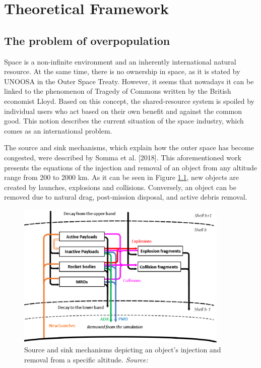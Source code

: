 \chapter{Theoretical Framework}
\label{chap:2}

\section{The problem of overpopulation}
\bigskip

Space is a non-infinite environment and an inherently %
international natural resource. At the same time, there is no ownership in space, as it is stated by UNOOSA in the Outer Space Treaty. However, it seems that nowadays it can be linked to the phenomenon of Tragedy of Commons written by the British economist Lloyd. Based on this concept, the shared-resource system is spoiled by individual users who act based on their own benefit and against the common good. This notion describes the current situation of the space industry, which comes as an international problem.

\bigskip
The source and sink mechanisms, which explain how the outer space has become congested, were described by Somma et al. [2018]. This aforementioned work \cite{Somma 2019} presents the equations of the injection and removal of an object from any altitude range from 200 to 2000 km. As it can be seen in Figure \ref{mechanism}, new objects are created by launches, explosions and collisions. Conversely, an object can be removed due to natural drag, post-mission disposal, and active debris removal.

\begin{figure}
\centering
\includegraphics[width=0.9\textwidth]{Images/mechanism.png}\caption{Source and sink mechanisms depicting an object's injection and removal from a specific altitude. \textit{Source: \cite{Somma 2019}}}
\label{mechanism} 
\end{figure}

